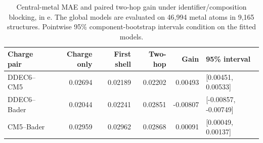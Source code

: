\begin{table}[!htbp]
\centering\small
\caption{Central-metal MAE and paired two-hop gain under identifier/composition blocking, in e. The global models are evaluated on 46,994 metal atoms in 9,165 structures. Pointwise 95\% component-bootstrap intervals condition on the fitted models.}
\label{tab:si-metal}
\setlength{\tabcolsep}{3pt}
\begin{tabular}{lrrrrl}
\toprule
Charge pair & Charge only & First shell & Two-hop & Gain & 95\% interval \\
\midrule
DDEC6--CM5 & 0.02694 & 0.02189 & 0.02202 & 0.00493 & [0.00451, 0.00533] \\
DDEC6--Bader & 0.02044 & 0.02241 & 0.02851 & -0.00807 & [-0.00857, -0.00749] \\
CM5--Bader & 0.02959 & 0.02962 & 0.02868 & 0.00091 & [0.00049, 0.00137] \\
\bottomrule
\end{tabular}
\end{table}
